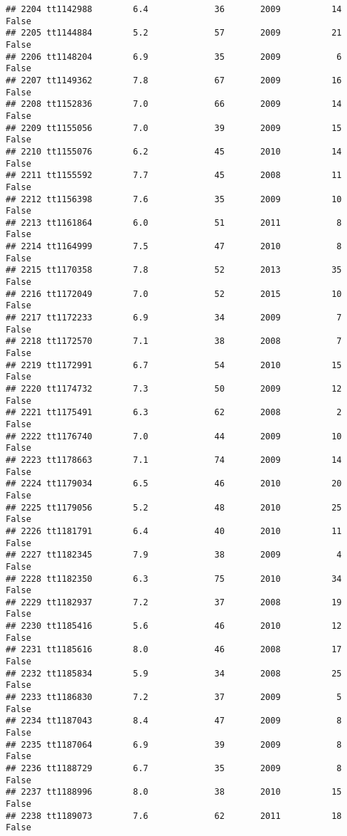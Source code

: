\documentclass[
]{article}
\begin{document}
\begin{verbatim}
## 2204 tt1142988        6.4             36       2009          14   False
## 2205 tt1144884        5.2             57       2009          21   False
## 2206 tt1148204        6.9             35       2009           6   False
## 2207 tt1149362        7.8             67       2009          16   False
## 2208 tt1152836        7.0             66       2009          14   False
## 2209 tt1155056        7.0             39       2009          15   False
## 2210 tt1155076        6.2             45       2010          14   False
## 2211 tt1155592        7.7             45       2008          11   False
## 2212 tt1156398        7.6             35       2009          10   False
## 2213 tt1161864        6.0             51       2011           8   False
## 2214 tt1164999        7.5             47       2010           8   False
## 2215 tt1170358        7.8             52       2013          35   False
## 2216 tt1172049        7.0             52       2015          10   False
## 2217 tt1172233        6.9             34       2009           7   False
## 2218 tt1172570        7.1             38       2008           7   False
## 2219 tt1172991        6.7             54       2010          15   False
## 2220 tt1174732        7.3             50       2009          12   False
## 2221 tt1175491        6.3             62       2008           2   False
## 2222 tt1176740        7.0             44       2009          10   False
## 2223 tt1178663        7.1             74       2009          14   False
## 2224 tt1179034        6.5             46       2010          20   False
## 2225 tt1179056        5.2             48       2010          25   False
## 2226 tt1181791        6.4             40       2010          11   False
## 2227 tt1182345        7.9             38       2009           4   False
## 2228 tt1182350        6.3             75       2010          34   False
## 2229 tt1182937        7.2             37       2008          19   False
## 2230 tt1185416        5.6             46       2010          12   False
## 2231 tt1185616        8.0             46       2008          17   False
## 2232 tt1185834        5.9             34       2008          25   False
## 2233 tt1186830        7.2             37       2009           5   False
## 2234 tt1187043        8.4             47       2009           8   False
## 2235 tt1187064        6.9             39       2009           8   False
## 2236 tt1188729        6.7             35       2009           8   False
## 2237 tt1188996        8.0             38       2010          15   False
## 2238 tt1189073        7.6             62       2011          18   False

\end{verbatim}
\end{document}
